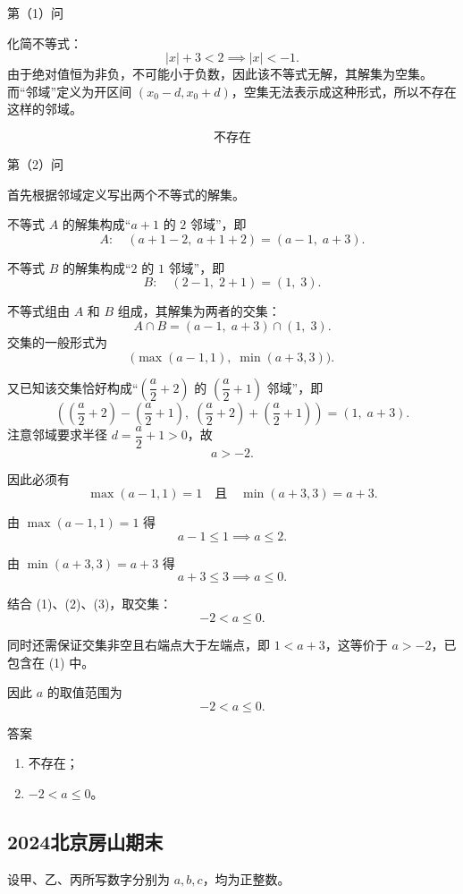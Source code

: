 第（1）问

化简不等式：
\[
|x| + 3 < 2 \implies |x| < -1.
\]
由于绝对值恒为非负，不可能小于负数，因此该不等式无解，其解集为空集。而“邻域”定义为开区间 \((x_0-d, x_0+d)\)，空集无法表示成这种形式，所以不存在这样的邻域。

\[
\boxed{\text{不存在}}
\]

第（2）问

首先根据邻域定义写出两个不等式的解集。

不等式 \(A\) 的解集构成“\(a+1\) 的 \(2\) 邻域”，即
\[
A:\quad (a+1-2,\; a+1+2) = (a-1,\; a+3).
\]

不等式 \(B\) 的解集构成“\(2\) 的 \(1\) 邻域”，即
\[
B:\quad (2-1,\; 2+1) = (1,\; 3).
\]

不等式组由 \(A\) 和 \(B\) 组成，其解集为两者的交集：
\[
A \cap B = (a-1,\; a+3) \cap (1,\; 3).
\]
交集的一般形式为
\[
\bigl(\max(a-1,1),\; \min(a+3,3)\bigr).
\]

又已知该交集恰好构成“\(\left(\dfrac{a}{2}+2\right)\) 的 \(\left(\dfrac{a}{2}+1\right)\) 邻域”，即
\[
\left(\left(\frac{a}{2}+2\right)-\left(\frac{a}{2}+1\right),\;
\left(\frac{a}{2}+2\right)+\left(\frac{a}{2}+1\right)\right)
= (1,\; a+3).
\]
注意邻域要求半径 \(d = \dfrac{a}{2}+1 > 0\)，故
\[
a > -2. \tag{1}
\]

因此必须有
\[
\max(a-1,1) = 1 \quad \text{且} \quad \min(a+3,3) = a+3.
\]

由 \(\max(a-1,1)=1\) 得
\[
a-1 \le 1 \implies a \le 2. \tag{2}
\]

由 \(\min(a+3,3)=a+3\) 得
\[
a+3 \le 3 \implies a \le 0. \tag{3}
\]

结合 (1)、(2)、(3)，取交集：
\[
-2 < a \le 0.
\]

同时还需保证交集非空且右端点大于左端点，即 \(1 < a+3\)，这等价于 \(a > -2\)，已包含在 (1) 中。

因此 \(a\) 的取值范围为
\[
\boxed{-2 < a \le 0}.
\]

{答案}

\begin{enumerate}
    \item 不存在；
    \item \(-2 < a \le 0\)。
\end{enumerate}


\subsection{2024北京房山期末}
\label{2024北京房山期末}

设甲、乙、丙所写数字分别为 \(a, b, c\)，均为正整数。

